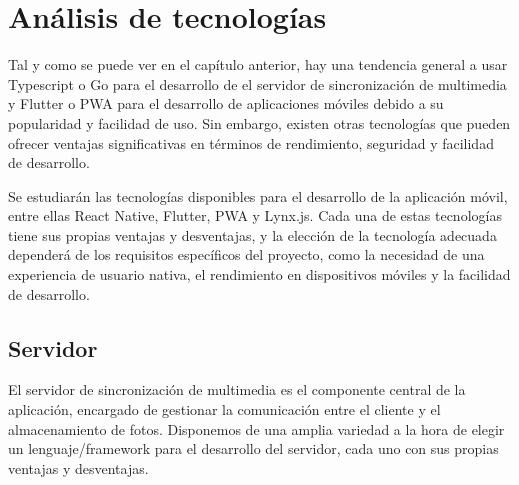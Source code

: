 \newpage
\section{Análisis de tecnologías}

Tal y como se puede ver en el capítulo anterior, hay una tendencia general a usar Typescript o Go para el desarrollo de el servidor de sincronización de multimedia y Flutter o PWA para el desarrollo de aplicaciones móviles debido a su popularidad y facilidad de uso.
Sin embargo, existen otras tecnologías que pueden ofrecer ventajas significativas en términos de rendimiento, seguridad y facilidad de desarrollo.


Se estudiarán las tecnologías disponibles para el desarrollo de la aplicación móvil, entre ellas React Native, Flutter, PWA y Lynx.js. Cada una de estas tecnologías tiene sus propias ventajas y desventajas, y la elección de la tecnología adecuada dependerá de los requisitos específicos del proyecto, como la necesidad de una experiencia de usuario nativa, el rendimiento en dispositivos móviles y la facilidad de desarrollo.

\subsection{Servidor}
El servidor de sincronización de multimedia es el componente central de la aplicación, encargado de gestionar la comunicación entre el cliente y el almacenamiento de fotos.
Disponemos de una amplia variedad a la hora de elegir un lenguaje/\gls{framework} para el desarrollo del servidor, cada uno con sus propias ventajas y desventajas.

